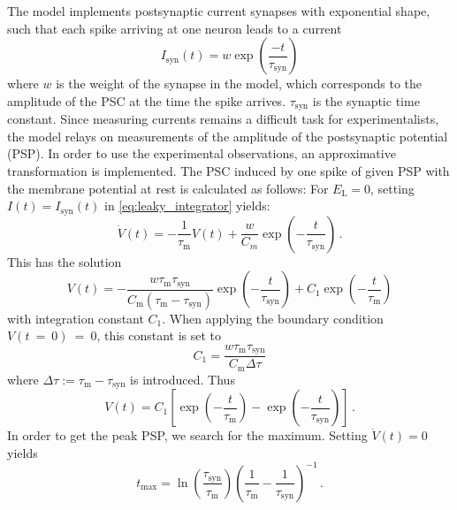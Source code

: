 The model implements  
postsynaptic current synapses with exponential shape, such that each 
spike arriving at one neuron leads to a current 
\begin{equation}
I_{\text{syn}}(t) = w \exp{\left(\frac{-t}{\tau_\text{syn}}\right)}	
    \label{eq:synaptic_current}
\end{equation}
where $w$ is the weight of the synapse in the model,
which corresponds to the amplitude of the PSC
at the time the spike arrives. 
$\tau_\text{syn}$ is the synaptic time constant.
Since measuring currents remains a difficult task for experimentalists, 
the model relays on measurements of the amplitude of the postsynaptic 
potential (PSP). In order to use the experimental observations,
an approximative transformation is implemented.
The PSC induced by one spike of given PSP with the membrane potential
at rest is calculated as follows:
For $E_\text{L} = 0$, setting $I(t) = I_\text{syn}(t)$ in \autoref{eq:leaky_integrator}
yields:
\begin{equation}
    \dot{V}(t)
    = - \frac{1}{\tau_\text{m}} V(t) + \frac{w}{C_m} \exp{\left(-\frac{t}{\tau_\text{syn}}\right)} \,.
    \label{eq:psc_ode}
\end{equation}
This has the solution 
\begin{equation}
    V(t) =   
        - \frac{w \tau_\text{m} \tau_\text{syn}} {C_\text{m} \left(\tau_\text{m} - \tau_\text{syn}\right)}	
        \exp{\left( -\frac{t}{\tau_\text{syn}} \right)} 
        + C_1 \exp{\left(-\frac{t}{\tau_\text{m}} \right)}
    \label{eq:psc_ode_sol}
\end{equation}
with integration constant $C_1$.
When applying the boundary condition $V(t~=~0)~=~0$, this constant is set to
\begin{equation}
    C_1 = \frac{w \tau_\text{m} \tau_\text{syn}}{C_\text{m} \Delta\tau}	
    \label{eq:C_1}
\end{equation}
where $\Delta\tau := \tau_\text{m} - \tau_\text{syn}$ is introduced.
Thus
\begin{equation}
    V(t) = C_1 \left[\exp\left(-\frac{t}{\tau_\text{m}}\right) - \exp\left(-\frac{t}{\tau_\text{syn}}\right)\right]	\,.  
    \label{eq:V(t)}
\end{equation}
In order to get the peak PSP, we search for the maximum. Setting $\dot{V}(t) = 0$ 
yields
\begin{equation}
    t_\text{max} 
        = \ln{\!\left(\frac{\tau_\text{syn}}{\tau_\text{m}}\right)} 
            \left(\frac{1}{\tau_\text{m}} - \frac{1}{\tau_\text{syn}}\right)^{-1} \,.
    \label{eq:t_max}
\end{equation}
